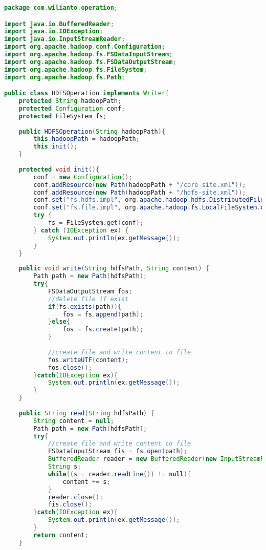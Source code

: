\begin{lstlisting}[language=Java,basicstyle=\tiny,caption=HDFSOperation.java]
package com.wilianto.operation;

import java.io.BufferedReader;
import java.io.IOException;
import java.io.InputStreamReader;
import org.apache.hadoop.conf.Configuration;
import org.apache.hadoop.fs.FSDataInputStream;
import org.apache.hadoop.fs.FSDataOutputStream;
import org.apache.hadoop.fs.FileSystem;
import org.apache.hadoop.fs.Path;

public class HDFSOperation implements Writer{
    protected String hadoopPath;
    protected Configuration conf;
    protected FileSystem fs;
    
    public HDFSOperation(String hadoopPath){
        this.hadoopPath = hadoopPath;
        this.init();
    }
    
    protected void init(){
        conf = new Configuration();
        conf.addResource(new Path(hadoopPath + "/core-site.xml"));
        conf.addResource(new Path(hadoopPath + "/hdfs-site.xml"));
        conf.set("fs.hdfs.impl", org.apache.hadoop.hdfs.DistributedFileSystem.class.getName());
        conf.set("fs.file.impl", org.apache.hadoop.fs.LocalFileSystem.class.getName());
        try {
            fs = FileSystem.get(conf);
        } catch (IOException ex) {
            System.out.println(ex.getMessage());
        }
    }
    
    public void write(String hdfsPath, String content) {
        Path path = new Path(hdfsPath);
        try{
            FSDataOutputStream fos;
            //delete file if exist
            if(fs.exists(path)){
                fos = fs.append(path);
            }else{
                fos = fs.create(path);
            }
            
            //create file and write content to file
            fos.writeUTF(content);
            fos.close();
        }catch(IOException ex){
            System.out.println(ex.getMessage());
        }
    }
    
    public String read(String hdfsPath) {
        String content = null;
        Path path = new Path(hdfsPath);
        try{
            //create file and write content to file
            FSDataInputStream fis = fs.open(path);
            BufferedReader reader = new BufferedReader(new InputStreamReader(fis.getWrappedStream()));
            String s;
            while((s = reader.readLine()) != null){
                content += s;
            }
            reader.close();
            fis.close();
        }catch(IOException ex){
            System.out.println(ex.getMessage());
        }
        return content;
    }
    

\end{lstlisting}
